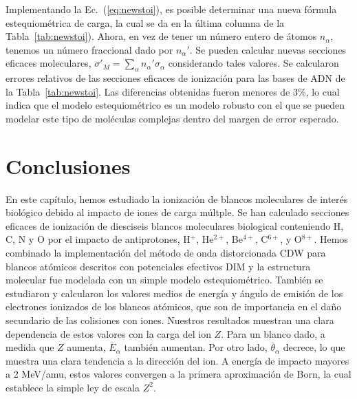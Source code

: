 Implementando la Ec.~(\ref{eq:newstoi}), es posible determinar una nueva 
fórmula estequiométrica de carga, la cual se da en la última columna de 
la Tabla~\ref{tab:newstoi}). Ahora, en vez de tener un número entero de 
átomos $n_{\alpha}$, tenemos un número fraccional dado por $n_{\alpha}'$. 
Se pueden calcular nuevas secciones eficaces moleculares, 
$\sigma'_{M}=\sum_{\alpha}n_{\alpha}'\sigma_{\alpha}$ considerando tales 
valores. Se calcularon errores relativos de las secciones eficaces de 
ionización para las bases de ADN de la Tabla~\ref{tab:newstoi}. Las 
diferencias obtenidas fueron menores de 3\%, lo cual indica que el modelo 
estequiométrico es un modelo robusto con el que se pueden modelar este 
tipo de moléculas complejas dentro del margen de error esperado.

\section{Conclusiones}

En este capítulo, hemos estudiado la ionización de blancos moleculares 
de interés biológico debido al impacto de iones de carga múltple. Se han
calculado secciones eficaces de ionización de diesciseis blancos 
moleculares biological conteniendo H, C, N y O por el impacto de
antiprotones, H$^{+}$, He$^{2+}$, Be$^{4+}$, C$^{6+}$, y O$^{8+}$. 
Hemos combinado la implementación del método de onda distorcionada
CDW para blancos atómicos descritos con potenciales efectivos DIM y la 
estructura molecular fue modelada con un simple modelo estequiométrico.
También se estudiaron y calcularon los valores medios de energía y 
ángulo de emisión de los electrones ionizados de los blancos atómicos, 
que son de importancia en el daño secundario de las colisiones con iones.
Nuestros resultados muestran una clara dependencia de estos valores con 
la carga del ion $Z$. Para un blanco dado, a medida que $Z$ aumenta,
$\overline{E}_{\alpha}$ también aumentan. Por otro lado, 
$\overline{\theta}_{\alpha}$ decrece, lo que muestra una clara tendencia 
a la dirección del ion. A energía de impacto mayores a 2 MeV/amu, estos
valores convergen a la primera aproximación de Born, la cual establece 
la simple ley de escala $Z^{2}$. 

